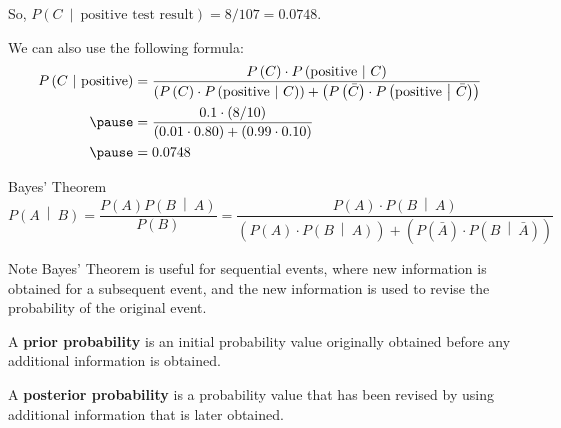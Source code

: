 \documentclass{beamer}
\newcommand{\prob}[1]{P\left(#1\right)}
\newcommand{\condprob}[2]{\prob{#1~\middle|~#2}}
\begin{document}
\begin{frame}
\begin{example}
{So, $\condprob{C}{\text{positive test result}}=8/107=0.0748$.\pause

\vspace{1mm}
We can also use the following formula:
\begin{equation*}
\begin{aligned}
\condprob{C}{\text{positive}}
&=\dfrac{\prob{C}\cdot\condprob{\text{positive}}{C}}{\left(\prob{C}\cdot\condprob{\text{positive}}{C}\right)+\left(\prob{\bar{C}}\cdot\condprob{\text{positive}}{\bar{C}}\right)}\\\pause
&=\dfrac{0.1\cdot(8/10)}{\left(0.01\cdot0.80\right)+\left(0.99\cdot0.10\right)}\\\pause
&=0.0748
\end{aligned}
\end{equation*}
\vspace{-2.2mm}
}
\end{example}
\end{frame}

\begin{frame}
\begin{block}{Bayes' Theorem}
\begin{equation*}
\condprob{A}{B}=\dfrac{\prob{A}\condprob{B}{A}}{\prob{B}} = \dfrac{\prob{A}\cdot\condprob{B}{A}}{\left(\prob{A}\cdot\condprob{B}{A}\right)+\left(\prob{\bar{A}}\cdot\condprob{B}{\bar{A}}\right)}
\end{equation*}
\end{block}\pause

\begin{block}{Note}
Bayes' Theorem is useful for sequential events, where new information is obtained for a subsequent event, and the new information is used to revise the probability of the original event.
\end{block}\pause

\begin{definition}
A \textbf{prior probability} is an initial probability value originally obtained before any additional information is obtained.
\end{definition}\pause

\begin{definition}
A \textbf{posterior probability} is a probability value that has been revised by using additional information that is later obtained.
\end{definition}
\end{frame}
\end{document}
